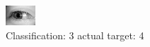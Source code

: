 \begin{figure}[h!]
\begin{center}
\includegraphics[width=0.60\columnwidth]{figures/ID3195_class_3_target_4.png}
\end{center}
\caption{ Classification: 3 actual target: 4}
\label{fig:ID3195_class_3_target_4}
\end{figure}

